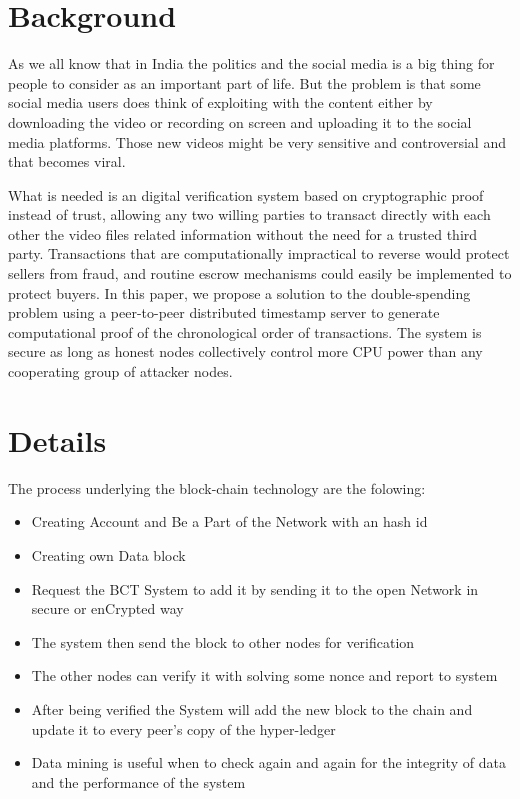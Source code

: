 \documentclass[a4paper,12pt]{report}
\begin{document}
\chapter{Background}
\label{Ch2} \setcounter{page}{1} 
\bigskip
As we all know that in India the politics and the social media is a big thing for people to consider as an important part of life. But the problem is that some social media users does think of exploiting with the content either by downloading the video or recording on screen and uploading it to the social media platforms. Those new videos might be very sensitive and controversial and that becomes viral.
\par What is needed is an digital verification system based on cryptographic proof instead of trust,
allowing any two willing parties to transact directly with each other the video files related information without the need for a trusted third party. Transactions that are computationally impractical to reverse would protect sellers from fraud, and routine escrow mechanisms could easily be implemented to protect buyers. In this paper, we propose a solution to the double-spending problem using a peer-to-peer distributed timestamp server to generate computational proof of the chronological order of transactions. The system is secure as long as honest nodes collectively control more CPU power than any cooperating group of attacker nodes.



\chapter{Details}
\label{Ch3} \setcounter{page}{1} 
\bigskip

The process underlying the block-chain technology are the folowing:
\begin{itemize}
\item Creating Account and Be a Part of the Network with an hash id
\item Creating own Data block
\item Request the BCT System to add it by sending it to the open Network in secure or enCrypted way
\item The system then send the block to other nodes for verification
\item The other nodes can verify it with solving some nonce and report to system
\item After being verified the System will add the new block to the chain and update it to every peer's copy of the hyper-ledger
\item Data mining is useful when to check again and again for the integrity of data and the performance of the system
\end{itemize}
\end{document}
